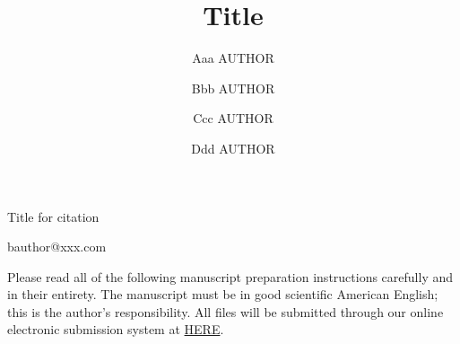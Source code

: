 \documentclass{SCIS2021}
\theoremstyle{exampstyle}
\begin{document}
	\Month{}
	\Vol{}
	\No{}
	\DOI{}
	\ArtNo{}
	\ReceiveDate{}
	\ReviseDate{}
	\AcceptDate{}
	\OnlineDate{}
	
	\title{Title}{Title for citation}
	
	\author[1]{Aaa AUTHOR}{}
        \author[1,2]{Bbb AUTHOR}{{bauthor@xxx.com}}
        \author[2]{Ccc AUTHOR}{}
        \author[3]{Ddd AUTHOR}{}
	
	
	

	\address[1]{Affiliation, City {\rm 000000}, Country}
        \address[2]{Affiliation, City {\rm 000000}, Country}
        \address[3]{Affiliation, City {\rm 000000}, Country}
	
	
	\maketitle
	
	
        Please read all of the following manuscript preparation instructions carefully and in their entirety. The manuscript must be in good scientific American English; this is the author's responsibility. All files will be submitted through our online electronic submission system at \href{https://mc03.manuscriptcentral.com/scis}{HERE}.
%
%
%
% 
% 
%
\end{document}
